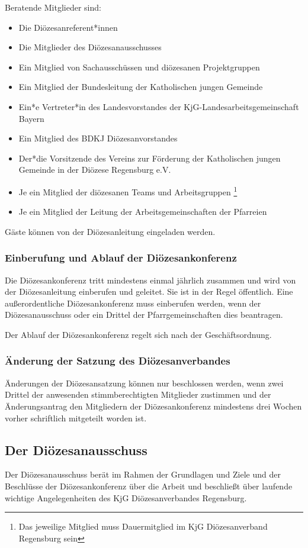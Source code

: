 \documentclass[12pt]{report}
\newcommand{\footnoteremember}[2]{%
  \footnote{#2}
  \newcounter{#1}
  \setcounter{#1}{\value{footnote}}
}
\newcommand{\footnoterecall}[1]{%
  \footnotemark[\value{#1}]
}
\begin{document}
\begin{justify}
Beratende Mitglieder sind:
\begin{itemize}
  \item Die Diözesanreferent*innen
  \item Die Mitglieder des Diözesanausschusses
  \item Ein Mitglied von Sachausschüssen und diözesanen Projektgruppen
  \item Ein Mitglied der Bundesleitung der Katholischen jungen Gemeinde
  \item Ein*e Vertreter*in des Landesvorstandes der KjG-Landesarbeitsgemeinschaft Bayern
  \item Ein Mitglied des BDKJ Diözesanvorstandes
  \item Der*die Vorsitzende des Vereins zur Förderung der Katholischen jungen Gemeinde in der
        Diözese Regensburg e.V.
  \item Je ein Mitglied der diözesanen Teams und
        Arbeitsgruppen\footnoteremember{Dauermitglied}{Das jeweilige Mitglied muss
        Dauermitglied im KjG Diözesanverband Regensburg sein}
  \item Je ein Mitglied der Leitung der Arbeitsgemeinschaften der
        Pfarreien\footnoterecall{Dauermitglied}
\end{itemize}

Gäste können von der Diözesanleitung eingeladen werden.
\subsubsection{Einberufung und Ablauf der Diözesankonferenz}
Die Diözesankonferenz tritt mindestens einmal jährlich zusammen und wird von der Diözesanleitung
einberufen und geleitet. Sie ist in der Regel öffentlich.
Eine außerordentliche Diözesankonferenz muss einberufen werden, wenn der Diözesanausschuss oder ein
Drittel der Pfarrgemeinschaften dies beantragen.

Der Ablauf der Diözesankonferenz regelt sich nach der Geschäftsordnung.

\subsubsection{Änderung der Satzung des Diözesanverbandes}
Änderungen der Diözesansatzung können nur beschlossen werden, wenn zwei Drittel der anwesenden
stimmberechtigten Mitglieder zustimmen und der Änderungsantrag den Mitgliedern der
Diözesankonferenz mindestens drei Wochen vorher schriftlich mitgeteilt worden ist.

\subsection{Der Diözesanausschuss}
Der Diözesanausschuss berät im Rahmen der Grundlagen und Ziele und der Beschlüsse der Diözesankonferenz
über die Arbeit und beschließt über laufende wichtige Angelegenheiten des KjG Diözesanverbandes Regensburg.


\end{justify}
\end{document}
